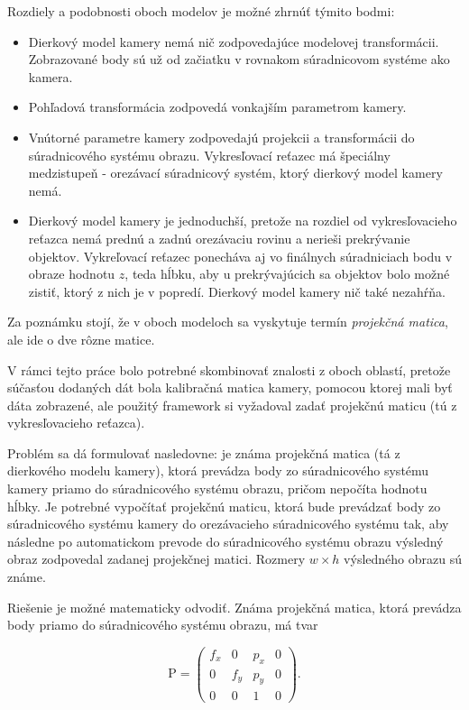 Rozdiely a podobnosti oboch modelov je možné zhrnúť týmito bodmi:
\begin{itemize}
    \item Dierkový model kamery nemá nič zodpovedajúce modelovej transformácii. Zobrazované body sú už od začiatku v rovnakom súradnicovom systéme ako kamera.
    \item Pohľadová transformácia zodpovedá vonkajším parametrom kamery.
    \item Vnútorné parametre kamery zodpovedajú projekcii a transformácii do súradnicového systému obrazu. Vykresľovací reťazec má špeciálny medzistupeň - orezávací súradnicový systém, ktorý dierkový model kamery nemá.
    \item Dierkový model kamery je jednoduchší, pretože na rozdiel od vykresľovacieho reťazca nemá prednú a zadnú orezávaciu rovinu a nerieši prekrývanie objektov. Vykreľovací reťazec ponecháva aj vo finálnych súradniciach bodu v obraze hodnotu $z$, teda hĺbku, aby u prekrývajúcich sa objektov bolo možné zistiť, ktorý z nich je v popredí. Dierkový model kamery nič také nezahŕňa.
\end{itemize}

Za poznámku stojí, že v oboch modeloch sa vyskytuje termín \emph{projekčná matica}, ale ide o dve rôzne matice.

V rámci tejto práce bolo potrebné skombinovať znalosti z oboch oblastí, pretože súčasťou dodaných dát bola kalibračná matica kamery, pomocou ktorej mali byť dáta zobrazené, ale použitý framework si vyžadoval zadať projekčnú maticu (tú z vykresľovacieho reťazca).

Problém sa dá formulovať nasledovne: je známa projekčná matica (tá z dierkového modelu kamery), ktorá prevádza body zo súradnicového systému kamery priamo do súradnicového systému obrazu, pričom nepočíta hodnotu hĺbky. Je potrebné vypočítať projekčnú maticu, ktorá bude prevádzať body zo súradnicového systému kamery do orezávacieho súradnicového systému tak, aby následne po automatickom prevode do súradnicového systému obrazu výsledný obraz zodpovedal zadanej projekčnej matici. Rozmery $w \times h$ výsledného obrazu sú známe.

Riešenie je možné matematicky odvodiť. Známa projekčná matica, ktorá prevádza body priamo do súradnicového systému obrazu, má tvar

$$ \mathrm{P} =
\begin{pmatrix}
f_x & 0 & p_x & 0 \\
0 & f_y & p_y & 0 \\
0 & 0 &  1  & 0
\end{pmatrix} \mathrm{.}
$$

